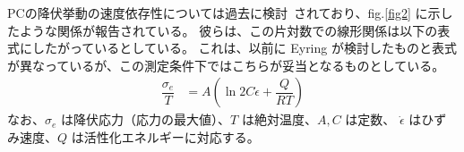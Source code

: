\documentclass[uplatex,dvipdfmx,a4paper,10pt]{jsarticle}
\begin{document}
PCの降伏挙動の速度依存性については過去に検討~\cite{bauwens}されており、fig.\ref{fig2} に示したような関係が報告されている。
彼らは、この片対数での線形関係は以下の表式にしたがっているとしている。
これは、以前に Eyring が検討したものと表式が異なっているが、この測定条件下ではこちらが妥当となるものとしている。
\begin{align}
	\dfrac{\sigma_e}{T} 
		&= A \left(\ln 2 C \dot{\epsilon} + \dfrac{Q}{RT} \right)
	 \label{eq1}
\end{align}
なお、$\sigma_e$ は降伏応力（応力の最大値）、$T$ は絶対温度、$A, C$ は定数、 $\dot{\epsilon}$ はひずみ速度、$Q$ は活性化エネルギーに対応する。

\end{document}
